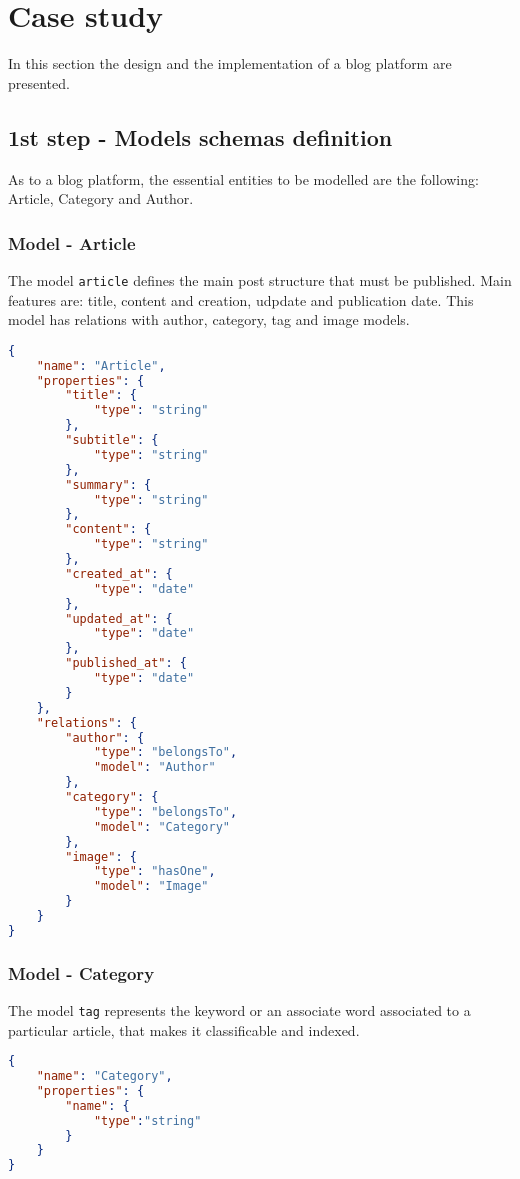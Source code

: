 \section{Case study}
\label{sec:CAS_castudy}

In this section the design and the implementation of a blog platform are presented.

\subsection{1st step - Models schemas definition}

As to a blog platform, the essential entities to be modelled are the following: Article, Category and Author.

\subsubsection{Model - Article}

The model \texttt{article} defines the main post structure that must be published. Main features are: title, content and creation, udpdate and publication date. This model has relations with author, category, tag and image models. 

\begin{lstlisting}[language=json]
{
	"name": "Article",
	"properties": {
		"title": {
      		"type": "string"
    	},
    	"subtitle": {
      		"type": "string"
    	},
    	"summary": {
      		"type": "string"
    	},
    	"content": {
      		"type": "string"
    	},
    	"created_at": {
      		"type": "date"
    	},
    	"updated_at": {
      		"type": "date"
    	},
    	"published_at": {
      		"type": "date"
    	}
  	},
	"relations": {
    	"author": {
      		"type": "belongsTo",
      		"model": "Author"
    	},
    	"category": {
      		"type": "belongsTo",
      		"model": "Category"
    	},
    	"image": {
      		"type": "hasOne",
      		"model": "Image"
    	}
    }
}
\end{lstlisting}
\subsubsection{Model - Category}

The model \texttt{tag} represents the keyword or an associate word associated to a particular article, that makes it classificable and indexed.

\begin{lstlisting}[language=json]
{
	"name": "Category",
	"properties": {
		"name": {
			"type":"string"
		}
	}
}
\end{lstlisting}
